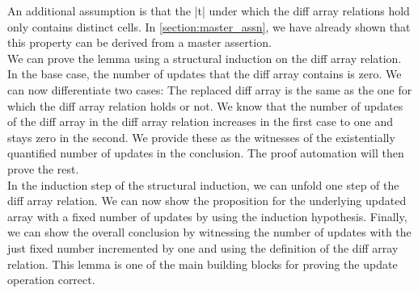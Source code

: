 \noindent An additional assumption is that the |t| under which the diff array relations hold only contains distinct cells. In \autoref{section:master_assn}, we have already shown that this property can be derived from a master assertion.\\
We can prove the lemma using a structural induction on the diff array relation. In the base case, the number of updates that the diff array contains is zero. We can now differentiate two cases: The replaced diff array is the same as the one for which the diff array relation holds or not. We know that the number of updates of the diff array in the diff array relation increases in the first case to one and stays zero in the second. We provide these as the witnesses of the existentially quantified number of updates in the conclusion. The proof automation will then prove the rest.\\
In the induction step of the structural induction, we can unfold one step of the diff array relation. We can now show the proposition for the underlying updated array with a fixed number of updates by using the induction hypothesis. Finally, we can show the overall conclusion by witnessing the number of updates with the just fixed number incremented by one and using the definition of the diff array relation. This lemma is one of the main building blocks for proving the update operation correct.


